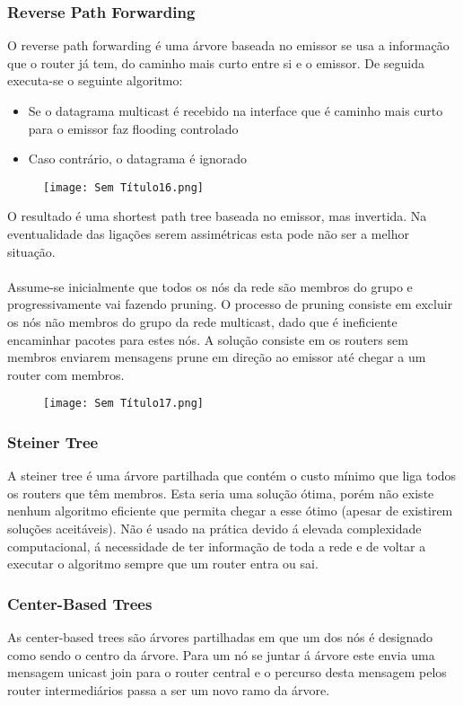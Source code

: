 \documentclass[10pt,a4paper]{report}
\begin{document}
\subsubsection{Reverse Path Forwarding}
O reverse path forwarding é uma árvore baseada no emissor se usa a informação que o router já tem, do caminho mais curto entre si e o emissor. De seguida executa-se o seguinte algoritmo:
\begin{itemize}
\item Se o datagrama multicast é recebido na interface que é caminho mais curto para o emissor faz flooding controlado
\item Caso contrário, o datagrama é ignorado
\end{itemize}
\begin{figure}[H]
\centering
\texttt{[image: Sem Título16.png]}
\end{figure}
O resultado é uma shortest path tree baseada no emissor, mas invertida. Na eventualidade das ligações serem assimétricas esta pode não ser a melhor situação.\\
\\
Assume-se inicialmente que todos os nós da rede são membros do grupo e progressivamente vai fazendo pruning. O processo de pruning consiste em excluir os nós não membros do grupo da rede multicast, dado que é ineficiente encaminhar pacotes para estes nós. A solução consiste em os routers sem membros enviarem mensagens prune em direção ao emissor até chegar a um router com membros.
\begin{figure}[H]
\centering
\texttt{[image: Sem Título17.png]}
\end{figure}
\subsubsection{Steiner Tree}
A steiner tree é uma árvore partilhada que contém o custo mínimo que liga todos os routers que têm membros. Esta seria uma solução ótima, porém não existe nenhum algoritmo eficiente que permita chegar a esse ótimo (apesar de existirem soluções aceitáveis). Não é usado na prática devido á elevada complexidade computacional, á necessidade de ter informação de toda a rede e de voltar a executar o algoritmo sempre que um router entra ou sai.
\subsubsection{Center-Based Trees}
As center-based trees são árvores partilhadas em que um dos nós é designado como sendo o centro da árvore. Para um nó se juntar á árvore este envia uma mensagem unicast join para o router central e o percurso desta mensagem pelos router intermediários passa a ser um novo ramo da árvore.
\end{document}
